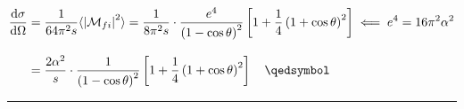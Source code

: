 \begin{solution}
\begin{enumerate}[label=(\alph*)]
            \begin{align*}
                \frac{\dif\sigma}{\dif\Omega} &= \frac{1}{64\pi^2 s}  \expval{\left|\mathcal{M}_{fi}\right|^2} = \frac{1}{8\pi^2 s} \cdot \frac{e^4 }{  \left( 1-\cos\theta\right)^2} \left[ 1+ \frac{1}{4}\left(1+\cos\theta\right)^2 \right]  \impliedby e^4 = 16\pi^2\alpha^2\\[0.12in]
                &= \frac{2\alpha^2}{s} \cdot\frac{1 }{  \left( 1-\cos\theta\right)^2} \left[ 1+ \frac{1}{4}\left(1+\cos\theta\right)^2 \right] \qed
            \end{align*}
    \end{enumerate}
\end{solution}

\noindent\rule{7in}{1.5pt}


